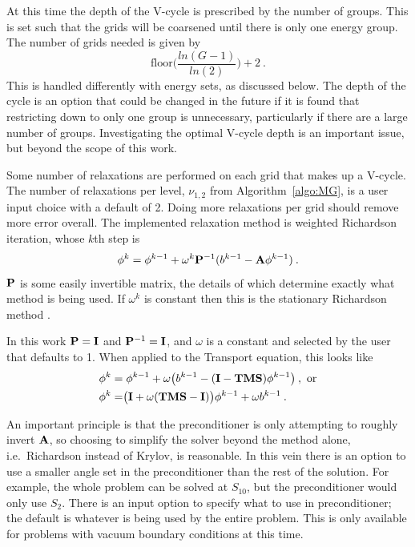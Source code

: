 At this time the depth of the V-cycle is prescribed by the number of groups. This is set such that the grids will be coarsened until there is only one energy group. The number of grids needed is given by \cite{BinaryTree2011}
\begin{equation}
  \text{floor}\bigl( \frac{ln(G-1)}{ln(2)}\bigr) + 2 \:.
  \label{eq:NumGrids}
\end{equation}
%
This is handled differently with energy sets, as discussed below. The depth of the cycle is an option that could be changed in the future if it is found that restricting down to only one group is unnecessary, particularly if there are a large number of groups. Investigating the optimal V-cycle depth is an important issue, but beyond the scope of this work. 

Some number of relaxations are performed on each grid that makes up a V-cycle. The number of relaxations per level, $\nu_{1,2}$ from Algorithm~\ref{algo:MG}, is a user input choice with a default of 2. Doing more relaxations per grid should remove more error overall. The implemented relaxation method is weighted Richardson iteration, whose $k$th step is
%
\begin{equation}
  \phi^{k} = \phi^{k-1} + \omega^{k}\mathbf{P}^{-1}(b^{k-1} - \mathbf{A}\phi^{k-1}) \:.
  \label{eq:Richardson}
\end{equation}
%
$\mathbf{P}$ is some easily invertible matrix, the details of which determine exactly what method is being used. If $\omega^{k}$ is constant then this is the stationary Richardson method \cite{Moore1999}. 

In this work $\mathbf{P} = \mathbf{I}$ and $\mathbf{P}^{-1} = \mathbf{I}$, and $\omega$ is a constant and selected by the user that defaults to 1. When applied to the Transport equation, this looks like
%
\begin{align}
  \phi^{k} &= \phi^{k-1} + \omega\bigr(b^{k-1} - (\mathbf{I} - \mathbf{TMS})\phi^{k-1}\bigl) \:, \text{ or} \nonumber \\
  \phi^{k} &= \bigr(\mathbf{I} + \omega(\mathbf{TMS} - \mathbf{I})\bigl)\phi^{k-1} + \omega b^{k-1} \:.
  \label{eq:relax}
 \end{align}
  
An important principle is that the preconditioner is only attempting to roughly invert $\mathbf{A}$, so choosing to simplify the solver beyond the method alone, i.e.\ Richardson instead of Krylov, is reasonable. In this vein there is an option to use a smaller angle set in the preconditioner than the rest of the solution. For example, the whole problem can be solved at $S_{10}$, but the preconditioner would only use $S_{2}$. There is an input option to specify what to use in preconditioner; the default is whatever is being used by the entire problem. This is only available for problems with vacuum boundary conditions at this time. 

